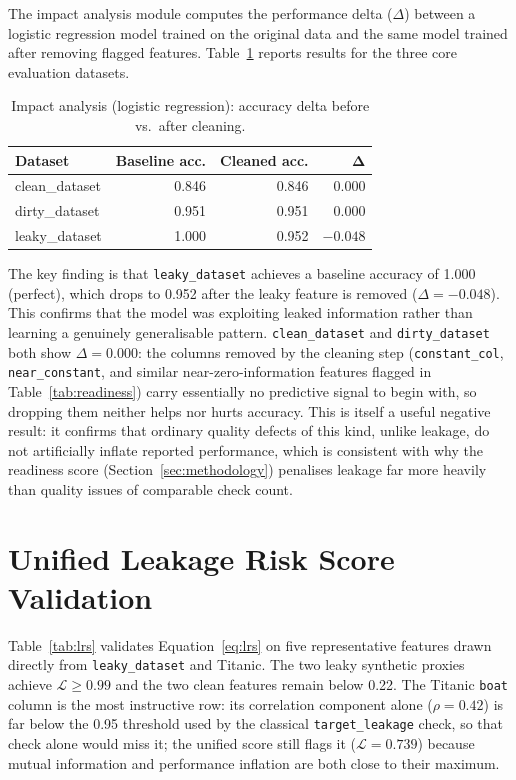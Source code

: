 \documentclass[12pt,a4paper]{report}
\newcommand{\tblhead}{\rowcolor{tblHeadBg}\color{white}\bfseries}
\begin{document}
The impact analysis module computes the performance delta ($\Delta$) between a logistic
regression model trained on the original data and the same model trained after removing
flagged features.  Table~\ref{tab:impact} reports results for the three core evaluation
datasets.

\begin{table}[!ht]
\centering
\caption{Impact analysis (logistic regression): accuracy delta before vs.\ after cleaning.}
\label{tab:impact}
\scriptsize
{}
\begin{tabular}{lrrr}
\toprule
\tblhead \textbf{Dataset} & \textbf{Baseline acc.} & \textbf{Cleaned acc.} & $\boldsymbol{\Delta}$ \\
\midrule
clean\_dataset  & 0.846 & 0.846 & $0.000$ \\
dirty\_dataset  & 0.951 & 0.951 & $0.000$ \\
leaky\_dataset  & 1.000 & 0.952 & $-0.048$ \\
\bottomrule
\end{tabular}
\end{table}

The key finding is that \texttt{leaky\_dataset} achieves a baseline accuracy of 1.000
(perfect), which drops to 0.952 after the leaky feature is removed ($\Delta{=}{-}0.048$).
This confirms that the model was exploiting leaked information rather than learning a
genuinely generalisable pattern.  \texttt{clean\_dataset} and \texttt{dirty\_dataset} both
show $\Delta{=}0.000$: the columns removed by the cleaning step
(\texttt{constant\_col}, \texttt{near\_constant}, and similar near-zero-information
features flagged in Table~\ref{tab:readiness}) carry essentially no predictive signal to
begin with, so dropping them neither helps nor hurts accuracy.  This is itself a useful
negative result: it confirms that ordinary quality defects of this kind, unlike leakage,
do not artificially inflate reported performance, which is consistent with why the
readiness score (Section~\ref{sec:methodology}) penalises leakage far more heavily than
quality issues of comparable check count.

\section{Unified Leakage Risk Score Validation}
\label{sec:lrsvalidation}

Table~\ref{tab:lrs} validates Equation~\eqref{eq:lrs} on five representative features drawn
directly from \texttt{leaky\_dataset} and Titanic.  The two leaky synthetic proxies achieve
$\mathcal{L}\ge0.99$ and the two clean features remain below 0.22.  The Titanic
\texttt{boat} column is the most instructive row: its correlation component alone
($\rho{=}0.42$) is far below the 0.95 threshold used by the classical
\texttt{target\_leakage} check, so that check alone would miss it; the unified score
still flags it ($\mathcal{L}{=}0.739$) because mutual information and performance
inflation are both close to their maximum.
\end{document}
